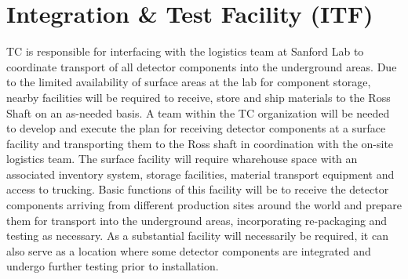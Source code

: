 \section{Integration \& Test Facility (ITF)}
\label{sec:fdsp-coord-integ-test}

 TC is responsible for interfacing with the  
logistics team at Sanford Lab to coordinate transport of all detector
components into the underground areas.  Due to the limited availability 
of surface areas at the lab for component storage, nearby facilities 
will be required to receive, store and ship materials to the Ross Shaft 
on an as-needed basis. A team within the TC organization will be needed 
to develop and execute the plan for receiving detector components at a 
surface facility and transporting them to the Ross shaft in coordination 
with the on-site  logistics team.  The surface facility will 
require wharehouse space with an associated inventory system, storage 
facilities, material transport equipment and access to trucking.  Basic 
functions of this facility will be to receive the detector components 
arriving from different production sites around the world and prepare 
them for transport into the underground areas, incorporating re-packaging 
and testing as necessary. As a substantial facility will necessarily be 
required, it can also serve as a location where some detector components 
are integrated and undergo further testing prior to installation.  

